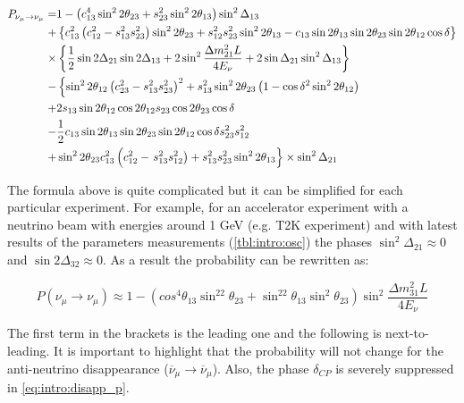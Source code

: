 \documentclass[../main.tex]{subfiles}
\begin{document}
\begin{equation}
\begin{split}
P_{\nu_\mu\to\nu_\mu}=&1-\left(c^4_{13}\sin^22\theta_{23} + s^2_{23}\sin^22\theta_{13}\right)\sin^2\Delta_{13} \\
+&\left\{c_{13}^2\left(c^2_{12}-s^2_{13}s^2_{23}\right)\sin^22\theta_{23}+s^2_{12}s^2_{23}\sin^22\theta_{13}-c_{13}\sin2\theta_{13}\sin2\theta_{23}\sin2\theta_{12}\cos\delta\right\} \\
\times&\left\{\frac{1}{2}\sin2\Delta_{21}\sin2\Delta_{13}+2\sin^2\frac{\Delta m_{21}^2L}{4E_\nu} + 2\sin\Delta_{21}\sin^2\Delta_{13}\right\} \\
-&\left\{\sin^22\theta_{12}\left(c^2_{23}-s^2_{13}s^2_{23}\right)^2+s_{13}^2\sin^22\theta_{23}\left(1-\cos\delta^2\sin^22\theta_{12}\right) \right.\\
+&2s_{13}\sin2\theta_{12}\cos2\theta_{12}s_{23}\cos2\theta_{23}\cos\delta \\
-&\frac{1}{2}c_{13}\sin2\theta_{13}\sin2\theta_{23}\sin2\theta_{12}\cos\delta s^2_{23}s^2_{12} \\
 +&\sin^22\theta_{23}c^2_{13}\left(c^2_{12}-\left. {}s^2_{13}s^2_{12}\right)+s^2_{13}s^2_{23}\sin^22\theta_{13} \vphantom{\left(\sin^22\theta_{12}\right)^2} \right\}\times\sin^2\Delta_{21}
\end{split}
\label{eq:intro:disapp_p}
\end{equation}

The formula above is quite complicated but it can be simplified for each particular experiment. For example, for an accelerator experiment with a neutrino beam with energies around 1 GeV (e.g. T2K experiment) and with latest results of the parameters measurements (\autoref{tbl:intro:osc}) the phases $\sin^2\Delta_{21}\approx0$ and $\sin2\Delta_{32}\approx0$. As a result the probability can be rewritten as:

\begin{equation}
\label{eq:intro:numu_simple}
P\left(\nu_\mu\to\nu_\mu\right)\approx1-\left(cos^4\theta_{13}\sin^22\theta_{23}+\sin^22\theta_{13}\sin^2\theta_{23}\right)\sin^2\frac{\Delta m^2_{31}L}{4E_\nu}
\end{equation}

The first term in the brackets is the leading one and the following is next-to-leading. It is important to highlight that the probability will not change for the anti-neutrino disappearance ($\overline{\nu}_\mu\to\overline{\nu}_\mu$). Also, the phase $\delta_{CP}$ is severely suppressed in \autoref{eq:intro:disapp_p}.
\end{document}
